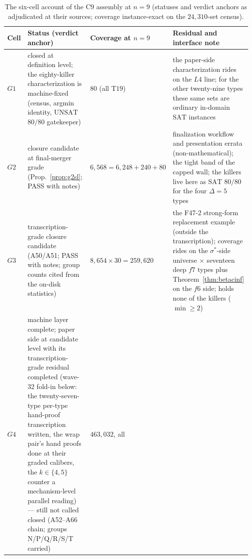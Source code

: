 \begin{table}[ht]
\centering\small
\caption{The six-cell account of the C9 assembly at $n=9$ (statuses and
verdict anchors as adjudicated at their sources; coverage instance-exact on
the $24{,}310$-set census).}
\label{tab:c9cells}
\begin{tabular}{p{0.9cm} p{4.0cm} p{2.3cm} p{6.3cm}}
\hline
Cell & Status (verdict anchor) & Coverage at $n{=}9$ & Residual and interface
note \\
\hline
$G1$ & closed at definition level; the eighty-killer characterization is
  machine-fixed (census, argmin identity, $\mathrm{UNSAT}$ $80/80$
  gatekeeper) & $80$ (all $\mathrm{T19}$) & the paper-side characterization
  rides on the $L4$ line; for the other twenty-nine types these same sets are
  ordinary in-domain $\mathrm{SAT}$ instances \\
$G2$ & closure candidate at final-merger grade (Prop.~\ref{prop:g2sl};
  PASS with notes) & $6{,}568=6{,}248+240+80$ & finalization workflow and
  presentation errata (non-mathematical); the tight band of the capped wall;
  the killers live here as $\mathrm{SAT}$ $80/80$ for the four $\Delta=5$
  types \\
$G3$ & transcription-grade closure candidate (A50/A51; PASS with notes;
  group counts cited from the on-disk statistics) & $8{,}654\times
  30=259{,}620$ & the F47-2 strong-form replacement example (outside the
  transcription); coverage rides on the $\sigma^\ast$-side universe
  $\times$ seventeen deep $f7$ types plus Theorem~\ref{thm:betacinf} on the
  $f6$ side; holds none of the killers ($\min\ge2$) \\
$G4$ & machine layer complete; paper side at candidate level with its
  transcription-grade residual completed (wave-32 fold-in below: the
  twenty-seven-type per-type hand-proof transcription written, the wrap
  pair's hand proofs done at their graded calibers, the $k\in\{4,5\}$
  counter a mechanism-level parallel reading) --- still not called closed
  (A52--A66 chain; groups N/P/Q/R/S/T carried) & $463{,}032$, all

\end{tabular}
\end{table}
